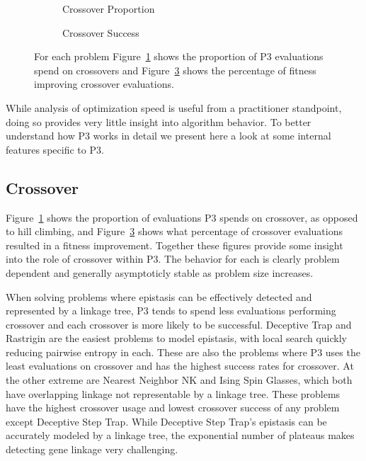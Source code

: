 \begin{figure}[t]
  \begin{centering}
    \begin{subfigure}{.5\textwidth}
      \begin{centering}
      \end{centering}
      \caption{Crossover Proportion}
      \label{fig-cross}
    \end{subfigure}%
    \begin{subfigure}{.5\textwidth}
      \begin{centering}
      \end{centering}
      \caption{Crossover Success}
      \label{fig-cross-success}
    \end{subfigure}
  \end{centering}
  \caption{For each problem Figure~\ref{fig-cross} shows the proportion of P3 evaluations spend on crossovers
           and Figure~\ref{fig-cross-success} shows the percentage of fitness improving crossover evaluations.}
\end{figure}

While analysis of optimization speed is useful from a practitioner standpoint, doing so provides very
little insight into algorithm behavior. To better understand how P3 works in detail we present here
a look at some internal features specific to P3.

\subsection{Crossover}
Figure~\ref{fig-cross} shows the proportion of evaluations P3 spends on crossover, as opposed to hill climbing,
and Figure~\ref{fig-cross-success} shows what percentage of crossover evaluations resulted in a fitness improvement.
Together these figures provide some insight into the role of crossover within P3. The behavior
for each is clearly problem dependent and generally asymptoticly stable as problem size increases.

When solving problems where epistasis can be effectively detected and represented by a linkage tree, P3 tends to spend
less evaluations performing crossover and each crossover is more likely to be successful.
Deceptive Trap and Rastrigin are the easiest problems to model epistasis, with local search quickly
reducing pairwise entropy in each. These are also the problems where P3 uses the least evaluations
on crossover and has the highest success rates for crossover. At the other extreme are Nearest Neighbor
NK and Ising Spin Glasses, which both have overlapping linkage not representable by a linkage tree.
These problems have the highest crossover usage and lowest crossover success of any problem except Deceptive
Step Trap.  While Deceptive Step Trap's epistasis can be accurately modeled by a linkage tree, the
exponential number of plateaus makes detecting gene linkage very challenging.

